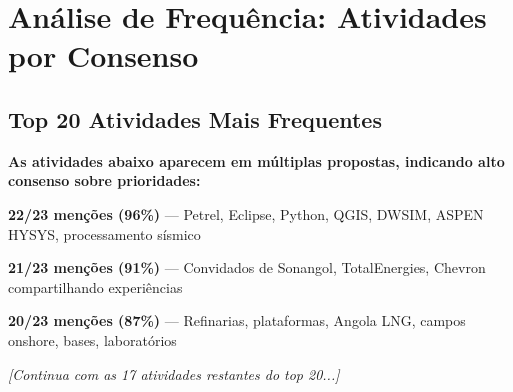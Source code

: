 \documentclass[12pt,a4paper,oneside]{article}
\begin{document}
\newpage

\section{Análise de Frequência: Atividades por Consenso}

\subsection{Top 20 Atividades Mais Frequentes}

{\color{spe-secondary}\bfseries As atividades abaixo aparecem em múltiplas propostas, indicando alto consenso sobre prioridades:}

\vspace{1cm}

\begin{tcbraster}[raster columns=1, nobeforeafter]

\begin{tcolorbox}[
  enhanced,
  colframe=spe-accent,
  colback=highlight-yellow,
  title={\color{white}\bfseries 🥇~Workshops Técnicos},
  boxrule=1pt,
  arc=3pt
]
  \textbf{22/23 menções (96\%)} — Petrel, Eclipse, Python, QGIS, DWSIM, ASPEN HYSYS, processamento sísmico
\end{tcolorbox}

\begin{tcolorbox}[
  enhanced,
  colframe=spe-secondary,
  colback=highlight-blue,
  title={\color{white}\bfseries 🥈~Palestras com Profissionais},
  boxrule=1pt,
  arc=3pt
]
  \textbf{21/23 menções (91\%)} — Convidados de Sonangol, TotalEnergies, Chevron compartilhando experiências
\end{tcolorbox}

\begin{tcolorbox}[
  enhanced,
  colframe=spe-primary,
  colback=highlight-green,
  title={\color{white}\bfseries 🥉~Visitas Técnicas},
  boxrule=1pt,
  arc=3pt
]
  \textbf{20/23 menções (87\%)} — Refinarias, plataformas, Angola LNG, campos onshore, bases, laboratórios
\end{tcolorbox}

\end{tcbraster}

\vspace{0.8cm}

\textit{[Continua com as 17 atividades restantes do top 20...]}

\newpage

\end{document}
